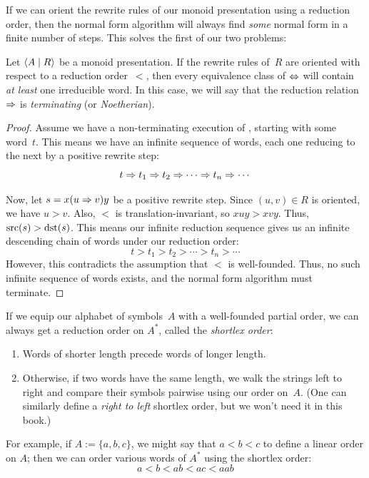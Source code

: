 \documentclass[../generics]{subfiles}
\begin{document}
If we can orient the rewrite rules of our monoid presentation using a reduction order, then the normal form algorithm will always find \emph{some} normal form in a finite number of steps. This solves the first of our two problems:

\begin{theorem}
Let $\langle A \mid R\rangle$ be a monoid presentation. If the rewrite rules of~$R$ are oriented with respect to a reduction order~$<$, then every equivalence class of $\Leftrightarrow$ will contain \emph{at least} one irreducible word. In this case, we will say that the reduction relation $\Rightarrow$ is \emph{terminating} (or \emph{Noetherian}).
\end{theorem}
\begin{proof}
Assume we have a non-terminating execution of , starting with some word~$t$. This means we have an infinite sequence of words, each one reducing to the next by a positive rewrite step:
\[ t\Rightarrow t_1\Rightarrow t_2 \Rightarrow \cdots \Rightarrow t_n \Rightarrow \cdots \]

Now, let $s=x(u\Rightarrow v)y$ be a positive rewrite step. Since $(u,v)\in R$ is oriented, we have $u>v$. Also, $<$ is translation-invariant, so $xuy>xvy$. Thus, $\operatorname{src}(s)>\operatorname{dst}(s)$. This means our infinite reduction sequence gives us an infinite descending chain of words under our reduction order:
\[ t > t_1 > t_2 > \cdots > t_n > \cdots \]
However, this contradicts the assumption that $<$ is well-founded. Thus, no such infinite sequence of words exists, and the normal form algorithm must terminate.
\end{proof}

If we equip our alphabet of symbols~$A$ with a well-founded partial order, we can always get a reduction order on $A^*$, called the \emph{shortlex order}:
\begin{enumerate}
\item Words of shorter length precede words of longer length.
\item Otherwise, if two words have the same length, we walk the strings left to right and compare their symbols pairwise using our order on~$A$. (One can similarly define a \emph{right to left} shortlex order, but we won't need it in this book.)
\end{enumerate}
For example, if $A:=\{a,b,c\}$, we might say that $a<b<c$ to define a linear order on $A$; then we can order various words of $A^*$ using the shortlex order: \[a<b<ab<ac<aab\]
\end{document}
